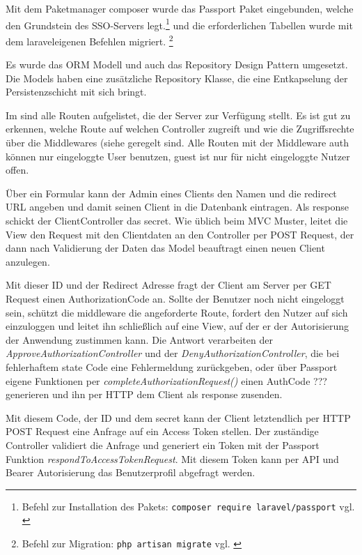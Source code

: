 Mit dem Paketmanager composer wurde das Passport Paket eingebunden, welche den Grundstein des SSO-Servers legt.\footnote{Befehl zur Installation des Pakets: \texttt{composer require laravel/passport} vgl. \cite{composer}} und die erforderlichen Tabellen wurde mit dem laraveleigenen Befehlen migriert. \footnote{Befehl zur Migration: \texttt{php artisan migrate} vgl. \cite{Laravel}}

Es wurde das ORM Modell und auch das Repository Design Pattern umgesetzt. Die Models haben eine zusätzliche  Repository Klasse, die eine Entkapselung der Persistenzschicht mit sich bringt.

Im  sind alle Routen aufgelistet, die der Server zur Verfügung stellt. Es ist gut zu erkennen, welche Route auf welchen Controller zugreift und wie die Zugriffsrechte über die Middlewares (siehe  geregelt sind. Alle Routen mit der Middleware auth können nur eingeloggte User benutzen, guest ist nur für nicht eingeloggte Nutzer offen.

Über ein Formular kann der Admin eines Clients den Namen und die redirect URL angeben und damit seinen Client in die Datenbank eintragen. Als response schickt der ClientController das secret.
Wie üblich beim MVC Muster, leitet die View den Request mit den Clientdaten an den Controller per POST Request, der dann nach Validierung der Daten das Model beauftragt einen neuen Client anzulegen. 

Mit dieser ID und der Redirect Adresse fragt der Client am Server per GET Request einen AuthorizationCode an. Sollte der Benutzer noch nicht eingeloggt sein, schützt die middleware die angeforderte Route, fordert den Nutzer auf sich einzuloggen und leitet ihn schließlich auf eine View, auf der er der Autorisierung der Anwendung zustimmen kann. Die Antwort verarbeiten der \textit{ApproveAuthorizationController} und der \textit{DenyAuthorizationController}, die bei fehlerhaftem state Code eine Fehlermeldung zurückgeben, oder über Passport eigene Funktionen per \textit{completeAuthorizationRequest()} einen AuthCode ??? generieren und ihn per HTTP dem Client als response zusenden.

Mit diesem Code, der ID und dem secret kann der Client letztendlich per HTTP POST Request eine Anfrage auf ein Access Token stellen. Der zuständige Controller validiert die Anfrage und generiert ein Token mit der Passport Funktion \textit{respondToAccessTokenRequest}. Mit diesem Token kann per API und Bearer Autorisierung das Benutzerprofil abgefragt werden.

